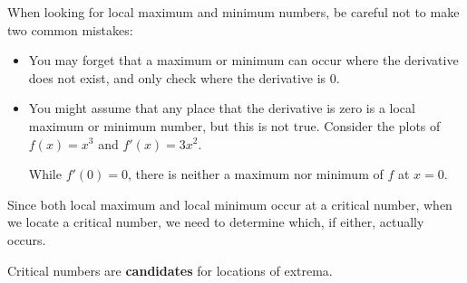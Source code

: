 \documentclass{ximera}
\begin{document}
\begin{warning} 


When looking for local maximum and minimum numbers, be careful not to
make two common mistakes: 
\begin{itemize}
\item You may forget that a maximum or minimum can occur where the
  derivative does not exist, and only check where the derivative is $0$. 
\item You might assume that any place that the derivative is zero is a
  local maximum or minimum number, but this is not true. Consider the
  plots of $f(x) = x^3$ and $f'(x) = 3x^2$.
\begin{image}
\end{image}
While $f'(0)=0$, there is neither a maximum nor minimum of $f$ at $x=0$.
\end{itemize}
\end{warning}



Since both local maximum and
local minimum occur at a critical number, when we locate a critical number, we need to determine which, if either,
actually occurs. 


Critical numbers are \textbf{candidates} for locations of extrema.
\end{document}
